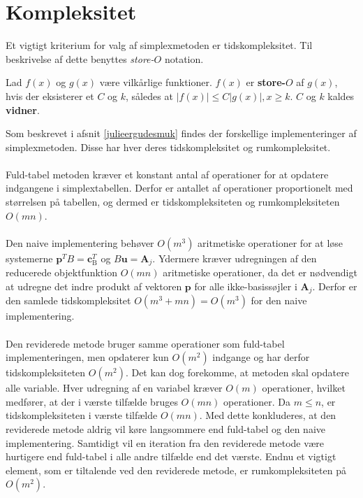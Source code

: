 \section{Kompleksitet}
\label{kompleksitet}
Et vigtigt kriterium for valg af simplexmetoden er tidskompleksitet.
Til beskrivelse af dette benyttes \textit{store-$O$} notation.
%
\begin{defn}{}{}
Lad $f(x)$ og $g(x)$ være vilkårlige funktioner. $f(x)$ er \textbf{store-$O$} af $g(x)$, hvis der eksisterer et $C$ og $k$, således at $|f(x)| \leq C|g(x)|, x \geq k$. $C$ og $k$ kaldes \textbf{vidner}.
\end{defn}
\noindent
%
Som beskrevet i afsnit \ref{julieergudesmuk} findes der forskellige implementeringer af simplexmetoden.
Disse har hver deres tidskompleksitet og rumkompleksitet.\\\\
%
Fuld-tabel metoden kræver et konstant antal af operationer for at opdatere indgangene i simplextabellen.
Derfor er antallet af operationer proportionelt med størrelsen på tabellen, og dermed er tidskompleksiteten og rumkompleksiteten $O(mn)$.\\\\
Den naive implementering behøver $O(m^3)$ aritmetiske operationer for at løse systemerne $\mathbf{p}^T B=\mathbf{c}_{\text{B}}^T$ og $B\mathbf{u}=\mathbf{A}_j$.
Ydermere kræver udregningen af den reducerede objektfunktion %
$O(mn)$ aritmetiske operationer, da det er nødvendigt at udregne det indre produkt af vektoren $\mathbf{p}$ for alle ikke-basissøjler i $\mathbf{A}_j$.
Derfor er den samlede tidskompleksitet $O(m^3 + mn) = O(m^3)$ for den naive implementering.\\\\
%
Den reviderede metode bruger samme operationer som fuld-tabel implementeringen, men opdaterer kun $O(m^2)$ indgange og har derfor tidskompleksiteten $O(m^2)$.
Det kan dog forekomme, at metoden skal opdatere alle variable.
Hver udregning af en variabel kræver $O(m)$ operationer, hvilket medfører, at der i værste tilfælde bruges $O(mn)$ operationer.
Da $m \leq n$, er tidskompleksiteten i værste tilfælde $O(mn)$.
Med dette konkluderes, at den reviderede metode aldrig vil køre langsommere end fuld-tabel og den naive implementering.
Samtidigt vil en iteration fra den reviderede metode være hurtigere end fuld-tabel i alle andre tilfælde end det værste.
Endnu et vigtigt element, som er tiltalende ved den reviderede metode, er rumkompleksiteten på $O(m^2)$.
